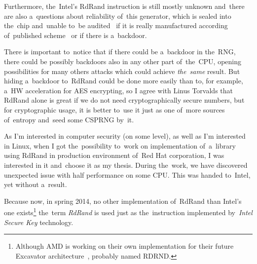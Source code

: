 \par{
Furthermore, the~Intel's RdRand instruction is still mostly unknown 
and~there are also a~questions about reliability of~this generator, 
which is sealed into the~chip and~unable to~be audited~\cite{TheodoreTsoNSA} 
if it is really manufactured according of~published 
scheme~\cite{AnalysisOfDRNG} or if there is a~backdoor. 
}

\par{
There is important to~notice that if there could be a~backdoor in the~RNG, 
there could be possibly backdoors also in any other part of~the~CPU, opening 
possibilities for many others attacks which could achieve {\em the~same} result. 
But hiding a~backdoor to~RdRand could be done more easily than to, 
for example, a~HW acceleration for AES encrypting, so I agree with Linus 
Torvalds that RdRand alone is great if we do not need cryptographically secure 
numbers, but for cryptographic usage, it is better to~use it just as one of~more 
sources of~entropy and~seed some CSPRNG by~it.
}

\par{
As I'm interested in computer security (on some level), 
as well as I'm interested in Linux, 
when I got the~possibility to~work on implementation of~a~library using RdRand
in production environment of~Red Hat corporation, 
I was interested in it and~choose it as my thesis. 
During the~work, we have discovered unexpected issue with half performance 
on some CPU. This was handed to~Intel, yet without a~result. 
}
\par{
Because now, in spring 2014, no other implementation of~RdRand than Intel's 
one exists\footnote{Although AMD is working on their own implementation 
for their future Excavator architecture~\cite{AMDRdRand}, probably named 
RDRND.}
the~term {\em RdRand} is used just as the~instruction implemented 
by~{\em Intel Secure Key} technology.
}



